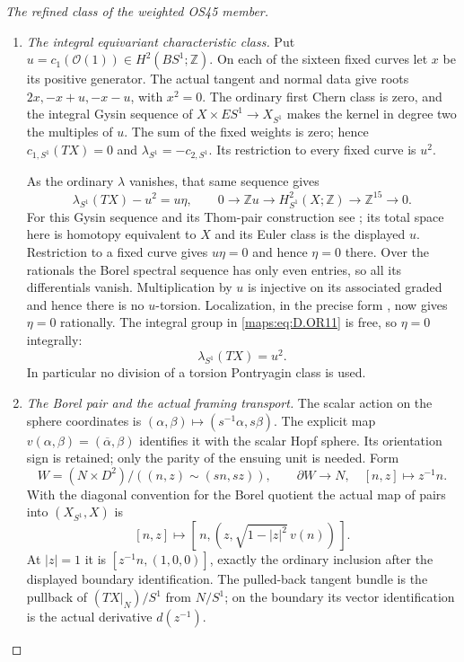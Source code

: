 \begin{proof}[The refined class of the weighted OS45 member]
\begin{enumerate}
\item \emph{The integral equivariant characteristic class.}
Put $u=c_1(\mathcal O(1))\in H^2(BS^1;\mathbb Z)$.  On each of the
sixteen fixed curves let $x$ be its positive generator.  The actual
tangent and normal data give roots
$2x,-x+u,-x-u$, with $x^2=0$.
The ordinary first Chern class is zero, and the integral Gysin sequence
of $X\times ES^1\to X_{S^1}$ makes the kernel in degree two the
multiples of $u$.  The sum of the fixed weights is zero; hence
$c_{1,S^1}(TX)=0$ and $\lambda_{S^1}=-c_{2,S^1}$.
Its restriction to every fixed curve is $u^2$.

As the ordinary $\lambda$ vanishes, that same sequence gives
\[
 \lambda_{S^1}(TX)-u^2=u\eta,\qquad
 0\longrightarrow\mathbb Zu\longrightarrow H^2_{S^1}(X;\mathbb Z)
 \longrightarrow\mathbb Z^{15}\longrightarrow0.
 \tag{D.OR11}\label{maps:eq:D.OR11}
\]
For this Gysin sequence and its Thom-pair construction see
\cite[\S4.D, pp.~438,444]{Hatcher2002}; its total space here is
homotopy equivalent to $X$ and its Euler class is the displayed $u$.
Restriction to a fixed curve gives $u\eta=0$ and hence $\eta=0$ there.
Over the rationals the Borel spectral sequence has only even entries,
so all its differentials vanish.  Multiplication by $u$ is injective
on its associated graded and hence there is no $u$-torsion.
Localization, in the precise form
\cite[Theorem~3.5 and the circle specialization, p.~8]{AtiyahBott1984},
now gives $\eta=0$ rationally.  The integral group in
\eqref{maps:eq:D.OR11} is free, so $\eta=0$ integrally:
\[
                         \lambda_{S^1}(TX)=u^2.
 \tag{D.OR12}\label{maps:eq:D.OR12}
\]
In particular no division of a torsion Pontryagin class is used.

\item \emph{The Borel pair and the actual framing transport.}
The scalar action on the sphere coordinates is
$(\alpha,\beta)\mapsto(s^{-1}\alpha,s\beta)$.
The explicit map $v(\alpha,\beta)=(\overline\alpha,\beta)$ identifies
it with the scalar Hopf sphere.  Its orientation sign is retained; only
the parity of the ensuing unit is needed.  Form
\[
 W=(N\times D^2)/((n,z)\sim(sn,sz)),\qquad
 \partial W\longrightarrow N,\quad[n,z]\longmapsto z^{-1}n.
\]
With the diagonal convention for the Borel quotient the actual map of
pairs into $(X_{S^1},X)$ is
\[
 [n,z]\longmapsto
 [\,n,(z,\sqrt{1-|z|^2}\,v(n))\,].
 \tag{D.OR13}\label{maps:eq:D.OR13}
\]
At $|z|=1$ it is $[z^{-1}n,(1,0,0)]$, exactly the ordinary inclusion
after the displayed boundary identification.  The pulled-back tangent
bundle is the pullback of $(TX|_N)/S^1$ from $N/S^1$; on the boundary
its vector identification is the actual derivative $d(z^{-1})$.


\end{enumerate}
\end{proof}
